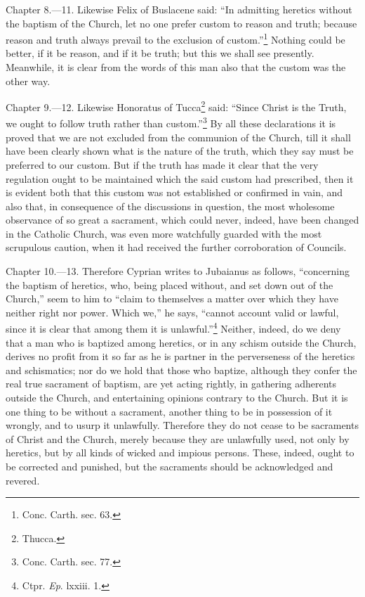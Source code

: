 
Chapter 8.—11. Likewise Felix of Buslacene said: ``In admitting heretics without the baptism of the Church, let no one prefer custom to reason and truth; because reason and truth always prevail to the exclusion of custom.''\footnote{\par  Conc. Carth. sec. 63.} Nothing could be better, if it be reason, and if it be truth; but this we shall see presently. Meanwhile, it is clear from the words of this man also that the custom was the other way.


Chapter 9.—12. Likewise Honoratus of Tucca\footnote{\par  Thucca.} said: ``Since Christ is the Truth, we ought to follow truth rather than custom.''\footnote{\par  Conc. Carth. sec. 77.} By all these declarations it is proved that we are not excluded from the communion of the Church, till it shall have been clearly shown what is the nature of the truth, which they say must be preferred to our custom. But if the truth has made it clear that the very regulation ought to be maintained which the said custom had prescribed, then it is evident both that this custom was not established or confirmed in vain, and also that, in consequence of the discussions in question, the most wholesome observance of so great a sacrament, which could never, indeed, have been changed in the Catholic Church, was even more watchfully guarded with the most scrupulous caution, when it had received the further corroboration of Councils.


Chapter 10.—13. Therefore Cyprian writes to Jubaianus as follows, ``concerning the baptism of heretics, who, being placed without, and set down out of the Church,'' seem to him to ``claim to themselves a matter over which they have neither right nor power. Which we,'' he says, ``cannot account valid or lawful, since it is clear that among them it is unlawful.''\footnote{\par  Ctpr. \emph{Ep}. lxxiii. 1.} Neither, indeed, do we deny that a man who is baptized among heretics, or in any schism outside the Church, derives no profit from it so far as he is partner in the perverseness of the heretics and schismatics; nor do we hold that those who baptize, although they confer the real true sacrament of baptism, are yet acting rightly, in gathering adherents outside the Church, and entertaining opinions contrary to the Church. But it is one thing to be without a sacrament, another thing to be in possession of it wrongly, and to usurp it unlawfully. Therefore they do not cease to be sacraments of Christ and the Church, merely because they are unlawfully used, not only by heretics, but by all kinds of wicked and impious persons. These, indeed, ought to be corrected and punished, but the sacraments should be acknowledged and revered.

